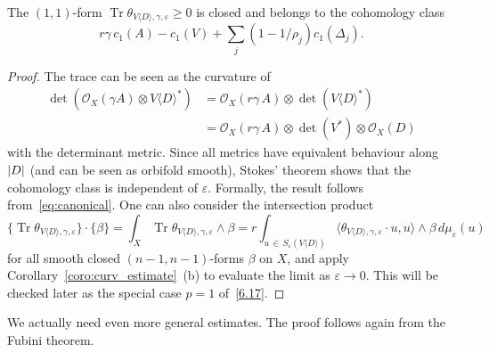 \documentclass[AHL,Unicode,longabstracts,published]{cedram}
\DeclareMathOperator{\Tr}{Tr}
\DeclarePairedDelimiter{\abs}{\lvert}{\rvert}
\newcommand*\cO{\mathcal{O}}
\let\geq\geqslant
\begin{document}
\begin{lemm}
The $(1,1)$-form
$\Tr\theta_{V\langle D\rangle,\gamma,\varepsilon}\geq 0$ is closed and belongs to the cohomology class
\[
r\gamma\,c_1(A)-c_1(V)+\sum_j\left(1-1/\rho_j\right)c_1(\Delta_j).
\]
\end{lemm}
\begin{proof}
The trace can be seen as the curvature of
\begin{align*}
\det(\cO_X(\gamma A)\otimes V\langle D\rangle^*) &=\cO_X(r\gamma\,A)\otimes \det(V\langle D\rangle^*)\\
&=\cO_X(r\gamma\,A)\otimes \det(V^*)\otimes\cO_X(D)
\end{align*}
with the determinant metric. Since all metrics have equivalent behaviour along $\abs{D}$ (and can be seen as orbifold smooth), Stokes' theorem shows that the cohomology class is independent of $\varepsilon$. Formally, the result follows from~\eqref{eq:canonical}. One can also consider the intersection product
\[
\{\Tr\theta_{V\langle D\rangle,\gamma,\varepsilon}\}\cdot \{\beta\} =\int_X\Tr\theta_{V\langle D\rangle,\gamma,\varepsilon}\wedge\beta =r\int_{u\,\in\,S_\varepsilon(V\langle D\rangle)}
\langle\theta_{V\langle D\rangle,\gamma,\varepsilon}\cdot u,u\rangle
\wedge\beta\,d\mu_\varepsilon(u)
\]
for all smooth closed
$(n-1,n-1)$-forms $\beta$ on $X$, and apply Corollary~\ref{coro:curv_estimate}~(b) to evaluate the limit as $\varepsilon\to 0$. This will be checked later as the special case $p=1$ of~\eqref{6.17}.
\end{proof}

We actually need even more general estimates. The proof follows again from the Fubini theorem.
\end{document}
